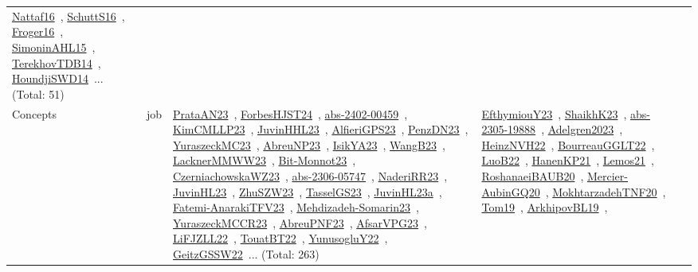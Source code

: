 {\begin{longtable}{lp{3cm}>{\raggedright\arraybackslash}p{6cm}>{\raggedright\arraybackslash}p{6cm}>{\raggedright\arraybackslash}p{8cm}}
\href{works/Nattaf16.pdf}{Nattaf16}~\cite{Nattaf16}, \href{works/SchuttS16.pdf}{SchuttS16}~\cite{SchuttS16}, \href{works/Froger16.pdf}{Froger16}~\cite{Froger16}, \href{works/SimoninAHL15.pdf}{SimoninAHL15}~\cite{SimoninAHL15}, \href{works/TerekhovTDB14.pdf}{TerekhovTDB14}~\cite{TerekhovTDB14}, \href{works/HoundjiSWD14.pdf}{HoundjiSWD14}~\cite{HoundjiSWD14}... (Total: 51)\\
Concepts & job & \href{works/PrataAN23.pdf}{PrataAN23}~\cite{PrataAN23}, \href{works/ForbesHJST24.pdf}{ForbesHJST24}~\cite{ForbesHJST24}, \href{works/abs-2402-00459.pdf}{abs-2402-00459}~\cite{abs-2402-00459}, \href{works/KimCMLLP23.pdf}{KimCMLLP23}~\cite{KimCMLLP23}, \href{works/JuvinHHL23.pdf}{JuvinHHL23}~\cite{JuvinHHL23}, \href{works/AlfieriGPS23.pdf}{AlfieriGPS23}~\cite{AlfieriGPS23}, \href{works/PenzDN23.pdf}{PenzDN23}~\cite{PenzDN23}, \href{works/YuraszeckMC23.pdf}{YuraszeckMC23}~\cite{YuraszeckMC23}, \href{works/AbreuNP23.pdf}{AbreuNP23}~\cite{AbreuNP23}, \href{works/IsikYA23.pdf}{IsikYA23}~\cite{IsikYA23}, \href{works/WangB23.pdf}{WangB23}~\cite{WangB23}, \href{works/LacknerMMWW23.pdf}{LacknerMMWW23}~\cite{LacknerMMWW23}, \href{works/Bit-Monnot23.pdf}{Bit-Monnot23}~\cite{Bit-Monnot23}, \href{works/CzerniachowskaWZ23.pdf}{CzerniachowskaWZ23}~\cite{CzerniachowskaWZ23}, \href{works/abs-2306-05747.pdf}{abs-2306-05747}~\cite{abs-2306-05747}, \href{works/NaderiRR23.pdf}{NaderiRR23}~\cite{NaderiRR23}, \href{works/JuvinHL23.pdf}{JuvinHL23}~\cite{JuvinHL23}, \href{works/ZhuSZW23.pdf}{ZhuSZW23}~\cite{ZhuSZW23}, \href{works/TasselGS23.pdf}{TasselGS23}~\cite{TasselGS23}, \href{works/JuvinHL23a.pdf}{JuvinHL23a}~\cite{JuvinHL23a}, \href{works/Fatemi-AnarakiTFV23.pdf}{Fatemi-AnarakiTFV23}~\cite{Fatemi-AnarakiTFV23}, \href{works/Mehdizadeh-Somarin23.pdf}{Mehdizadeh-Somarin23}~\cite{Mehdizadeh-Somarin23}, \href{works/YuraszeckMCCR23.pdf}{YuraszeckMCCR23}~\cite{YuraszeckMCCR23}, \href{works/AbreuPNF23.pdf}{AbreuPNF23}~\cite{AbreuPNF23}, \href{works/AfsarVPG23.pdf}{AfsarVPG23}~\cite{AfsarVPG23}, \href{works/LiFJZLL22.pdf}{LiFJZLL22}~\cite{LiFJZLL22}, \href{works/TouatBT22.pdf}{TouatBT22}~\cite{TouatBT22}, \href{works/YunusogluY22.pdf}{YunusogluY22}~\cite{YunusogluY22}, \href{works/GeitzGSSW22.pdf}{GeitzGSSW22}~\cite{GeitzGSSW22}... (Total: 263) & \href{works/EfthymiouY23.pdf}{EfthymiouY23}~\cite{EfthymiouY23}, \href{works/ShaikhK23.pdf}{ShaikhK23}~\cite{ShaikhK23}, \href{works/abs-2305-19888.pdf}{abs-2305-19888}~\cite{abs-2305-19888}, \href{works/Adelgren2023.pdf}{Adelgren2023}~\cite{Adelgren2023}, \href{works/HeinzNVH22.pdf}{HeinzNVH22}~\cite{HeinzNVH22}, \href{works/BourreauGGLT22.pdf}{BourreauGGLT22}~\cite{BourreauGGLT22}, \href{works/LuoB22.pdf}{LuoB22}~\cite{LuoB22}, \href{works/HanenKP21.pdf}{HanenKP21}~\cite{HanenKP21}, \href{works/Lemos21.pdf}{Lemos21}~\cite{Lemos21}, \href{works/RoshanaeiBAUB20.pdf}{RoshanaeiBAUB20}~\cite{RoshanaeiBAUB20}, \href{works/Mercier-AubinGQ20.pdf}{Mercier-AubinGQ20}~\cite{Mercier-AubinGQ20}, \href{works/MokhtarzadehTNF20.pdf}{MokhtarzadehTNF20}~\cite{MokhtarzadehTNF20}, \href{works/Tom19.pdf}{Tom19}~\cite{Tom19}, \href{works/ArkhipovBL19.pdf}{ArkhipovBL19}~\cite{ArkhipovBL19}, 
\end{longtable}}
